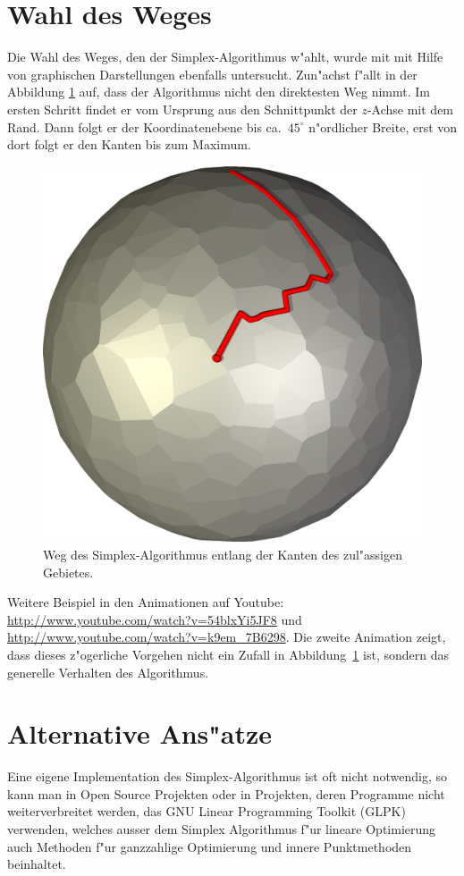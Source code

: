 \section{Wahl des Weges}
Die Wahl des Weges, den der Simplex-Algorithmus w"ahlt, wurde mit
mit Hilfe von graphischen Darstellungen ebenfalls untersucht.
Zun"achst f"allt in der Abbildung \ref{simplex:kanten} auf,
dass der Algorithmus nicht den direktesten Weg nimmt. Im ersten
Schritt findet er vom Ursprung aus den Schnittpunkt der $z$-Achse mit
dem Rand. Dann folgt er der Koordinatenebene bis ca.~$45^\circ$
n"ordlicher Breite, erst von dort folgt er den Kanten bis zum Maximum.
\begin{figure}
\begin{center}
\includegraphics[width=0.7\hsize]{add/sphere.jpg}
\end{center}
\caption{Weg des Simplex-Algorithmus entlang der Kanten 
des zul"assigen Gebietes.
\label{simplex:kanten}}
\end{figure}
Weitere Beispiel in den Animationen auf Youtube:
\url{http://www.youtube.com/watch?v=54blxYi5JF8}
und
\url{http://www.youtube.com/watch?v=k9em_7B6298}.
Die zweite Animation zeigt, dass dieses z"ogerliche Vorgehen nicht
ein Zufall in Abbildung~\ref{simplex:kanten} ist, sondern das
generelle Verhalten des Algorithmus.
\section{Alternative Ans"atze}
Eine eigene Implementation des Simplex-Algorithmus ist oft nicht
notwendig, so kann man in Open Source Projekten oder in Projekten,
deren Programme nicht weiterverbreitet werden, das GNU Linear
Programming Toolkit (GLPK) verwenden, welches ausser dem
Simplex Algorithmus f"ur lineare Optimierung auch Methoden f"ur
ganzzahlige Optimierung und innere Punktmethoden beinhaltet.
